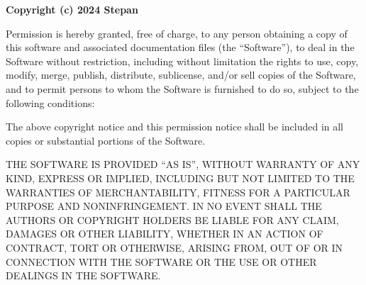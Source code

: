 \documentclass{article}
\begin{document}
\noindent\textbf{Copyright (c) 2024 Stepan}

\bigskip

\noindent Permission is hereby granted, free of charge, to any person obtaining a copy
of this software and associated documentation files (the ``Software''), to deal
in the Software without restriction, including without limitation the rights
to use, copy, modify, merge, publish, distribute, sublicense, and/or sell
copies of the Software, and to permit persons to whom the Software is
furnished to do so, subject to the following conditions:

\medskip

\noindent The above copyright notice and this permission notice shall be included in all
copies or substantial portions of the Software.

\medskip

\noindent THE SOFTWARE IS PROVIDED ``AS IS'', WITHOUT WARRANTY OF ANY KIND, EXPRESS OR
IMPLIED, INCLUDING BUT NOT LIMITED TO THE WARRANTIES OF MERCHANTABILITY,
FITNESS FOR A PARTICULAR PURPOSE AND NONINFRINGEMENT. IN NO EVENT SHALL THE
AUTHORS OR COPYRIGHT HOLDERS BE LIABLE FOR ANY CLAIM, DAMAGES OR OTHER
LIABILITY, WHETHER IN AN ACTION OF CONTRACT, TORT OR OTHERWISE, ARISING FROM,
OUT OF OR IN CONNECTION WITH THE SOFTWARE OR THE USE OR OTHER DEALINGS IN THE
SOFTWARE.
\end{document}
